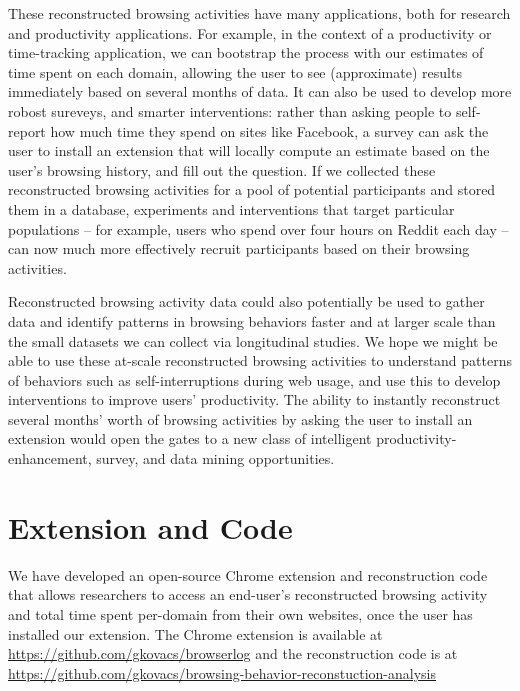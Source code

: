 \documentclass{sigchi}
\begin{document}
These reconstructed browsing activities have many applications, both for research and productivity applications. For example, in the context of a productivity or time-tracking application, we can bootstrap the process with our estimates of time spent on each domain, allowing the user to see (approximate) results immediately based on several months of data. It can also be used to develop more robost sureveys, and smarter interventions: rather than asking people to self-report how much time they spend on sites like Facebook, a survey can ask the user to install an extension that will locally compute an estimate based on the user's browsing history, and fill out the question. If we collected these reconstructed browsing activities for a pool of potential participants and stored them in a database, experiments and interventions that target particular populations -- for example, users who spend over four hours on Reddit each day -- can now much more effectively recruit participants based on their browsing activities. %

Reconstructed browsing activity data could also potentially be used to gather data and identify patterns in browsing behaviors faster and at larger scale than the small datasets we can collect via longitudinal studies. We hope we might be able to use these at-scale reconstructed browsing activities to understand patterns of behaviors such as self-interruptions during web usage, and use this to develop interventions to improve users' productivity. The ability to instantly reconstruct several months' worth of browsing activities by asking the user to install an extension would open the gates to a new class of intelligent productivity-enhancement, survey, and data mining opportunities.

\section{Extension and Code}

We have developed an open-source Chrome extension and reconstruction code that allows researchers to access an end-user's reconstructed browsing activity and total time spent per-domain from their own websites, once the user has installed our extension. The Chrome extension is available at \url{https://github.com/gkovacs/browserlog} and the reconstruction code is at \url{https://github.com/gkovacs/browsing-behavior-reconstuction-analysis}
\end{document}
